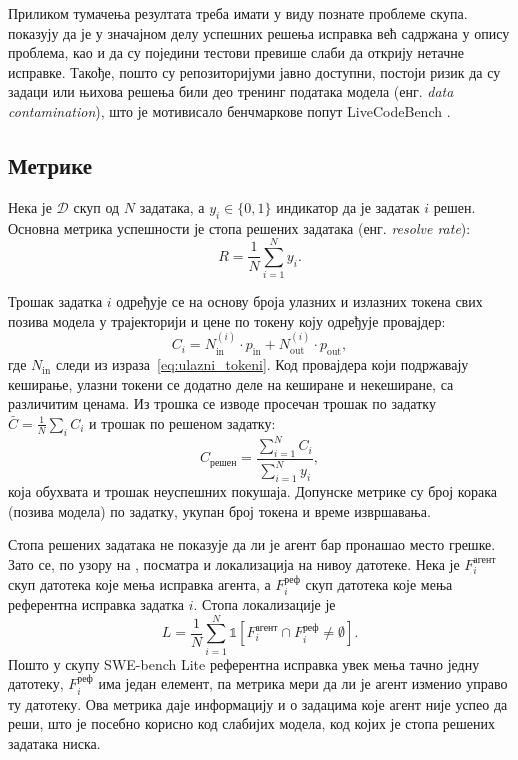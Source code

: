 \documentclass[12pt,a4paper]{report}
\begin{document}
	Приликом тумачења резултата треба имати у виду познате проблеме скупа.
	\textcite{aleithan2024swebenchplus} показују да је у значајном делу
	успешних решења исправка већ садржана у опису проблема, као и да су
	поједини тестови превише слаби да открију нетачне исправке. Такође, пошто су
	репозиторијуми јавно доступни, постоји ризик да су задаци или њихова
	решења били део тренинг података модела (енг. \textit{data contamination}),
	што је мотивисало бенчмаркове попут LiveCodeBench
	\parencite{jain2024livecodebench}.

	\subsection{Метрике}

	Нека је $\mathcal{D}$ скуп од $N$ задатака, а $y_i \in \{0, 1\}$ индикатор
	да је задатак $i$ решен. Основна метрика успешности је стопа решених
	задатака (енг. \textit{resolve rate}):
	\begin{equation}
		R = \frac{1}{N} \sum_{i=1}^{N} y_i.
	\end{equation}

	Трошак задатка $i$ одређује се на основу броја улазних и излазних токена
	свих позива модела у трајекторији и цене по токену коју одређује провајдер:
	\begin{equation}
		C_i = N^{(i)}_{\text{in}} \cdot p_{\text{in}} + N^{(i)}_{\text{out}} \cdot p_{\text{out}},
	\end{equation}
	где $N_{\text{in}}$ следи из израза~\eqref{eq:ulazni_tokeni}. Код провајдера
	који подржавају кеширање, улазни токени се додатно деле на кеширане и
	некеширане, са различитим ценама. Из трошка се изводе просечан трошак по
	задатку $\bar{C} = \frac{1}{N}\sum_i C_i$ и трошак по решеном задатку:
	\begin{equation}
		C_{\text{решен}} = \frac{\sum_{i=1}^{N} C_i}{\sum_{i=1}^{N} y_i},
	\end{equation}
	која обухвата и трошак неуспешних покушаја. Допунске метрике су број корака
	(позива модела) по задатку, укупан број токена и време извршавања.

	Стопа решених задатака не показује да ли је агент бар пронашао место
	грешке. Зато се, по узору на \textcite{xia2025agentless}, посматра и
	локализација на нивоу датотеке. Нека је $F_i^{\text{агент}}$ скуп датотека
	које мења исправка агента, а $F_i^{\text{реф}}$ скуп датотека које мења
	референтна исправка задатка $i$. Стопа локализације је
	\begin{equation}
		L = \frac{1}{N} \sum_{i=1}^{N} \mathbb{1}\left[F_i^{\text{агент}} \cap F_i^{\text{реф}} \neq \emptyset\right].
	\end{equation}
	Пошто у скупу SWE-bench Lite референтна исправка увек мења тачно једну
	датотеку, $F_i^{\text{реф}}$ има један елемент, па метрика мери да ли је
	агент изменио управо ту датотеку. Ова метрика даје информацију и о
	задацима које агент није успео да реши,
	што је посебно корисно код слабијих модела, код којих је стопа решених
	задатака ниска.
\end{document}
